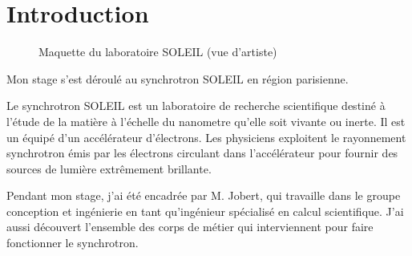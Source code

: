 



			
\chapter*{Introduction}

\begin{figure}
  \centering
  \caption{Maquette du laboratoire SOLEIL (vue d'artiste)}
\end{figure}

     Mon stage s'est déroulé au synchrotron SOLEIL en région parisienne. 



		
     Le synchrotron SOLEIL est un laboratoire de recherche scientifique destiné à l'étude de la matière à l'échelle du nanometre qu'elle soit vivante ou inerte. Il est un équipé d'un accélérateur d'électrons. Les physiciens exploitent le rayonnement synchrotron émis par les électrons circulant dans l'accélérateur pour fournir des sources de lumière extrêmement brillante.

     Pendant mon stage, j'ai été encadrée par M. Jobert, qui travaille dans le groupe conception et ingénierie en tant qu'ingénieur spécialisé en calcul scientifique. J'ai aussi découvert l'ensemble des corps de métier qui interviennent pour faire fonctionner le synchrotron.
		
